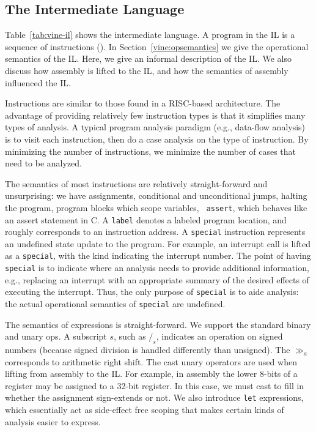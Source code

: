\subsection{The \bap Intermediate Language}




Table~\ref{tab:vine-il} shows the \bap intermediate language. A program
in the IL is a sequence of instructions ().  In
Section~\ref{vine:opsemantics} we give the operational semantics of
the IL.  Here, we give an informal description of the IL. We also
discuss how assembly is lifted to the IL, and how the semantics of
assembly influenced the IL.

Instructions are similar to those found in a RISC-based
architecture. The advantage of providing relatively few instruction
types is that it simplifies many types of analysis. A typical program
analysis paradigm (e.g., data-flow analysis) is to visit each
instruction, then do a case analysis on the type of instruction. By
minimizing the number of instructions, we minimize the number of cases
that need to be analyzed.

The semantics of most instructions are relatively straight-forward and
unsurprising: we have assignments, conditional and unconditional
jumps, halting the program, program blocks which scope variables, {\tt
  assert}, which behaves like an assert statement in C.  A {\tt label}
denotes a labeled program location, and roughly corresponds to an
instruction address.  A {\tt special} instruction represents an
undefined state update to the program.  For example, an interrupt call
is lifted as a {\tt special}, with the kind indicating the interrupt
number.  The point of having {\tt special} is to indicate where an
analysis needs to provide additional information, e.g., replacing an
interrupt with an appropriate summary of the desired effects of
executing the interrupt.  Thus, the only purpose of {\tt special} is
to aide analysis: the actual operational semantics of {\tt special}
are undefined.


The semantics of expressions is straight-forward. We support the
standard binary and unary ops. A subscript $s$, such as $/_s$,
indicates an operation on signed numbers (because signed division is
handled differently than unsigned).  The $\gg_a$ corresponds to
arithmetic right shift.  The cast unary operators are used when
lifting from assembly to the IL. For example, in assembly the lower
8-bits of a register may be assigned to a 32-bit register. In this
case, we must cast to fill in whether the assignment sign-extends or
not.   We also introduce {\tt let} expressions, which essentially act
as side-effect free scoping that makes certain kinds of analysis
easier to express.  

